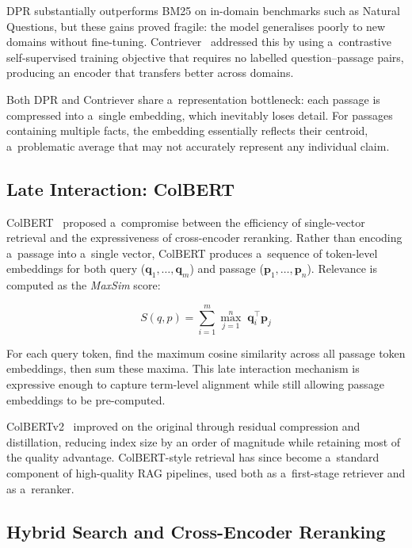 DPR substantially outperforms BM25 on in-domain benchmarks such as Natural Questions,
but these gains proved fragile: the model generalises poorly to new domains without
fine-tuning.
Contriever~\cite{izacard2021contriever} addressed this by using a~contrastive
self-supervised training objective that requires no labelled question--passage pairs,
producing an encoder that transfers better across domains.

Both DPR and Contriever share a~representation bottleneck: each passage is compressed
into a~single embedding, which inevitably loses detail.
For passages containing multiple facts, the embedding essentially reflects their
centroid, a~problematic average that may not accurately represent any individual
claim.

\subsection{Late Interaction: ColBERT}

ColBERT~\cite{khattab2020colbert} proposed a~compromise between the efficiency of
single-vector retrieval and the expressiveness of cross-encoder reranking.
Rather than encoding a~passage into a~single vector, ColBERT produces a~sequence
of token-level embeddings for both query ($\mathbf{q}_1,\ldots,\mathbf{q}_m$) and passage
($\mathbf{p}_1,\ldots,\mathbf{p}_n$).
Relevance is computed as the \emph{MaxSim} score:

\begin{equation}
  S(q, p) = \sum_{i=1}^{m}
    \max_{j=1}^{n}\; \mathbf{q}_i^\top \mathbf{p}_j
  \label{eq:maxsim}
\end{equation}

\noindent For each query token, find the maximum cosine similarity across all passage
token embeddings, then sum these maxima.
This late interaction mechanism is expressive enough to capture term-level alignment
while still allowing passage embeddings to be pre-computed.

ColBERTv2~\cite{santhanam2022colbertv2} improved on the original through
residual compression and distillation, reducing index size by an order of magnitude
while retaining most of the quality advantage.
ColBERT-style retrieval has since become a~standard component of high-quality
RAG pipelines, used both as a~first-stage retriever and as a~reranker.

\subsection{Hybrid Search and Cross-Encoder Reranking}

